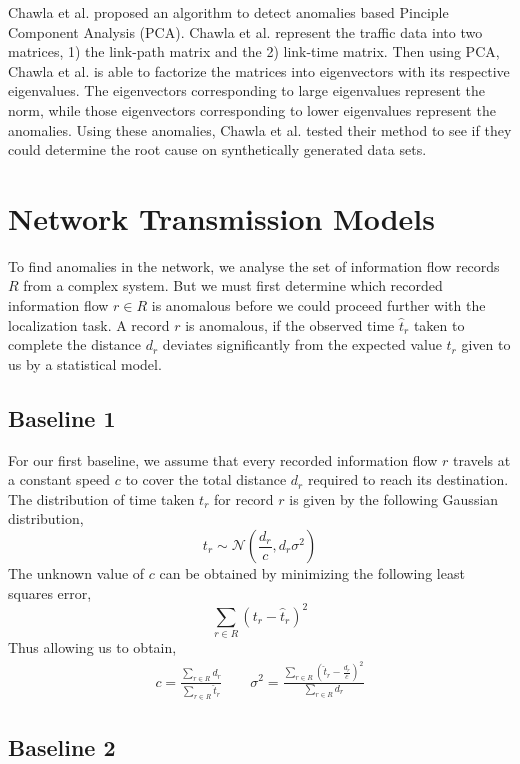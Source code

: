 \documentclass{sig-alternate}
\begin{document}
Chawla et al. \cite{Chawla2012} proposed an algorithm to detect anomalies based Pinciple Component Analysis (PCA). Chawla et al. \cite{Chawla2012} represent the traffic data into two matrices, 1) the link-path matrix and the 2) link-time matrix. Then using PCA, Chawla et al. \cite{Chawla2012} is able to factorize the matrices into eigenvectors with its respective eigenvalues. The eigenvectors corresponding to large eigenvalues represent the norm, while those eigenvectors corresponding to lower eigenvalues represent the anomalies. Using these anomalies, Chawla et al. \cite{Chawla2012} tested their method to see if they could determine the root cause on synthetically generated data sets.

\section{Network Transmission Models}
\label{sec:models}

To find anomalies in the network, we analyse the set of information flow records $R$ from a complex system. But we must first determine which recorded information flow $r \in R$ is anomalous before we could proceed further with the localization task. A record $r$ is anomalous, if the observed time $\hat{t}_r$ taken to complete the distance $d_r$ deviates significantly from the expected value $t_r$ given to us by a statistical model.

\subsection{Baseline 1}

For our first baseline, we assume that every recorded information flow $r$ travels at a constant speed $c$ to cover the total distance $d_r$ required to reach its destination. The distribution of time taken $t_r$ for record $r$ is given by the following Gaussian distribution,
\[ t_r \sim \mathcal{N} \left( \frac{d_r}{c}, d_r \sigma^2 \right) \]
The unknown value of $c$ can be obtained by minimizing the following least squares error,
\[ \sum_{r \in R} (t_r - \hat{t}_r)^2 \]
Thus allowing us to obtain,
\begin{gather*}
	c = \frac{\sum_{r \in R} d_r}{\sum_{r \in R} \hat{t}_r} \qquad
    \sigma^2 = \frac{ \sum_{r \in R} \left( \hat{t}_r - \frac{d_r}{c} \right)^2 }{ \sum_{r \in R} d_r }
\end{gather*}

\subsection{Baseline 2}
\end{document}
